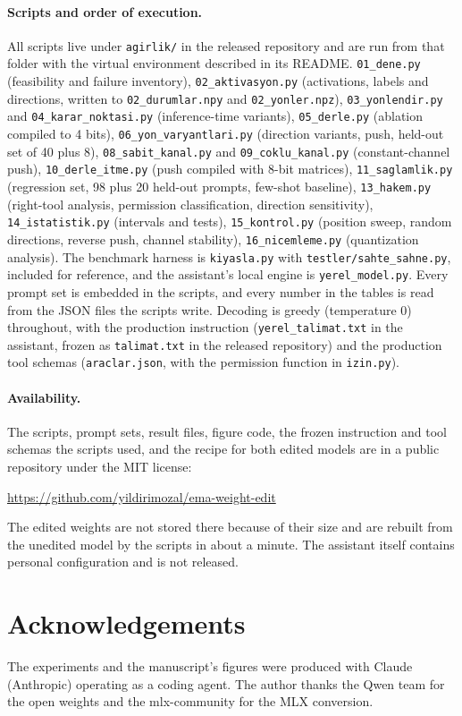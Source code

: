 \documentclass[11pt]{article}
\begin{document}
\begin{sloppypar}
\paragraph{Scripts and order of execution.} All scripts live under \texttt{agirlik/} in the released repository and are run from that folder with the virtual environment described in its README. \texttt{01\_dene.py} (feasibility and failure inventory), \texttt{02\_aktivasyon.py} (activations, labels and directions, written to \texttt{02\_durumlar.npy} and \texttt{02\_yonler.npz}), \texttt{03\_yonlendir.py} and \texttt{04\_karar\_noktasi.py} (inference-time variants), \texttt{05\_derle.py} (ablation compiled to 4 bits), \texttt{06\_yon\_varyantlari.py} (direction variants, push, held-out set of 40 plus 8), \texttt{08\_sabit\_kanal.py} and \texttt{09\_coklu\_kanal.py} (constant-channel push), \texttt{10\_derle\_itme.py} (push compiled with 8-bit matrices), \texttt{11\_saglamlik.py} (regression set, 98 plus 20 held-out prompts, few-shot baseline), \texttt{13\_hakem.py} (right-tool analysis, permission classification, direction sensitivity), \texttt{14\_istatistik.py} (intervals and tests), \texttt{15\_kontrol.py} (position sweep, random directions, reverse push, channel stability), \texttt{16\_nicemleme.py} (quantization analysis). The benchmark harness is \texttt{kiyasla.py} with \texttt{testler/sahte\_sahne.py}, included for reference, and the assistant's local engine is \texttt{yerel\_model.py}. Every prompt set is embedded in the scripts, and every number in the tables is read from the JSON files the scripts write. Decoding is greedy (temperature 0) throughout, with the production instruction (\texttt{yerel\_talimat.txt} in the assistant, frozen as \texttt{talimat.txt} in the released repository) and the production tool schemas (\texttt{araclar.json}, with the permission function in \texttt{izin.py}).
\end{sloppypar}

\paragraph{Availability.} The scripts, prompt sets, result files, figure code, the frozen instruction and tool schemas the scripts used, and the recipe for both edited models are in a public repository under the MIT license:
\begin{center}\url{https://github.com/yildirimozal/ema-weight-edit}\end{center}
The edited weights are not stored there because of their size and are rebuilt from the unedited model by the scripts in about a minute. The assistant itself contains personal configuration and is not released.

\section*{Acknowledgements}
The experiments and the manuscript's figures were produced with Claude (Anthropic) operating as a coding agent. The author thanks the Qwen team for the open weights and the mlx-community for the MLX conversion.



\end{document}
